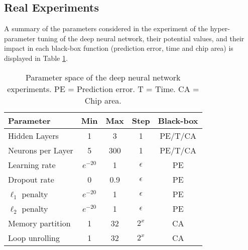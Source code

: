\subsection{Real Experiments}

A summary of the parameters considered in the experiment of the hyper-parameter tuning of the deep neural network, their potential values, and their impact in each
black-box function (prediction error, time and chip area) is displayed in Table \ref{table:aladdin}.

\begin{table}[htb]
\centering
\caption{Parameter space of the deep neural network experiments. PE = Prediction error. T = Time. CA = Chip area.}
\begin{tabular}{lcccc}
 \hline
\textbf{Parameter} & \textbf{Min} & \textbf{Max} & \textbf{Step} & \textbf{Black-box} \\
 \hline
Hidden Layers & 1& 3& 1& PE/T/CA\\
Neurons per Layer & 5& 300& 1& PE/T/CA\\
Learning rate & $e^{-20}$& 1& $\epsilon$ & PE\\
Dropout rate & 0& 0.9& $\epsilon$ & PE\\
$\ell_1$ penalty & $e^{-20}$& 1& $\epsilon$ & PE\\
$\ell_2$ penalty & $e^{-20}$& 1& $\epsilon$ & PE\\
\hline
Memory partition & 1& 32& $2^{x}$& CA\\
Loop unrolling & 1& 32& $2^{x}$& CA\\
\hline
\end{tabular}
\label{table:aladdin}
\end{table}

